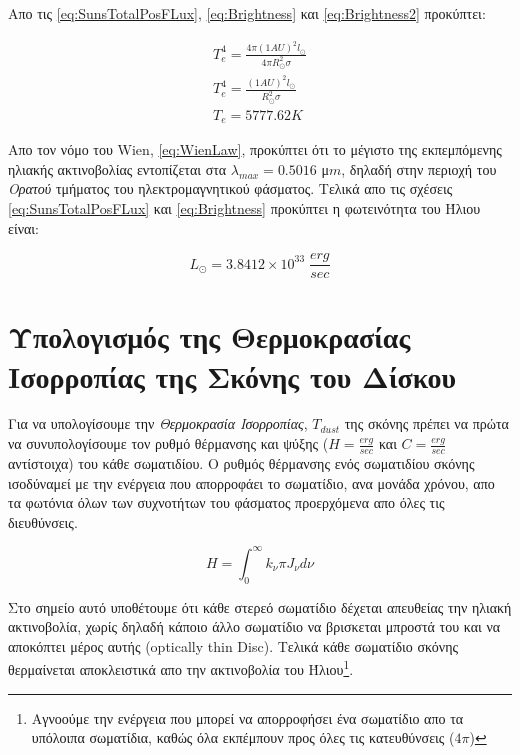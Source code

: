 Απο τις \eqref{eq:SunsTotalPosFLux}, \eqref{eq:Brightness} και \eqref{eq:Brightness2} προκύπτει:

\begin{align}
  T_{e}^4 = \frac{4\pi (1 AU)^2 l_\odot}{4\pi R_{\odot}^2 \sigma} \nonumber \\
  T_{e}^4 = \frac{(1 AU)^2 l_\odot}{R_{\odot}^2 \sigma} \nonumber \\
  T_{e} = 5777.62 K \label{eq:SunsTemp}
\end{align}

Απο τον νόμο του {\en Wien}, \eqref{eq:WienLaw}, προκύπτει ότι το μέγιστο της εκπεμπόμενης ηλιακής ακτινοβολίας εντοπίζεται στα $\lambda_{max}=0.5016$ μ$m$, δηλαδή στην περιοχή του {\it Ορατού} τμήματος του ηλεκτρομαγνητικού φάσματος. Τελικά απο τις σχέσεις \eqref{eq:SunsTotalPosFLux} και \eqref{eq:Brightness} προκύπτει η φωτεινότητα του Ήλιου είναι:

\begin{equation}\label{eq:Brightness3}
  L_\odot = 3.8412 \times 10^{33} \; \frac{erg}{sec}
\end{equation}


\section{Υπολογισμός της Θερμοκρασίας Ισορροπίας της Σκόνης του Δίσκου}

Για να υπολογίσουμε την {\it Θερμοκρασία Ισορροπίας}, $T_{dust}$ της σκόνης πρέπει να πρώτα να συνυπολογίσουμε τον ρυθμό θέρμανσης και ψύξης ($H = \frac{erg}{sec}$ και $C= \frac{erg}{sec}$ αντίστοιχα) του κάθε σωματιδίου. Ο ρυθμός θέρμανσης ενός σωματιδίου σκόνης ισοδύναμεί με την ενέργεια που απορροφάει το σωματίδιο, ανα μονάδα χρόνου, απο τα φωτόνια όλων των συχνοτήτων του φάσματος προερχόμενα απο όλες τις διευθύνσεις.

\begin{equation}\label{eq:HeatingRate}
H =  \int_{0}^{\infty} k_{\nu} \pi J_{\nu} d\nu 
\end{equation}

Στο σημείο αυτό υποθέτουμε ότι κάθε στερεό σωματίδιο δέχεται απευθείας την ηλιακή ακτινοβολία, χωρίς δηλαδή κάποιο άλλο σωματίδιο να βρισκεται μπροστά του και να αποκόπτει μέρος αυτής ({\en optically thin Disc}). Τελικά κάθε σωματίδιο σκόνης θερμαίνεται αποκλειστικά απο την ακτινοβολία του Ήλιου\footnote{Aγνοούμε την ενέργεια που μπορεί να απορροφήσει ένα σωματίδιο απο τα υπόλοιπα σωματίδια, καθώς όλα εκπέμπουν προς όλες τις κατευθύνσεις ($4\pi$)}.\\

